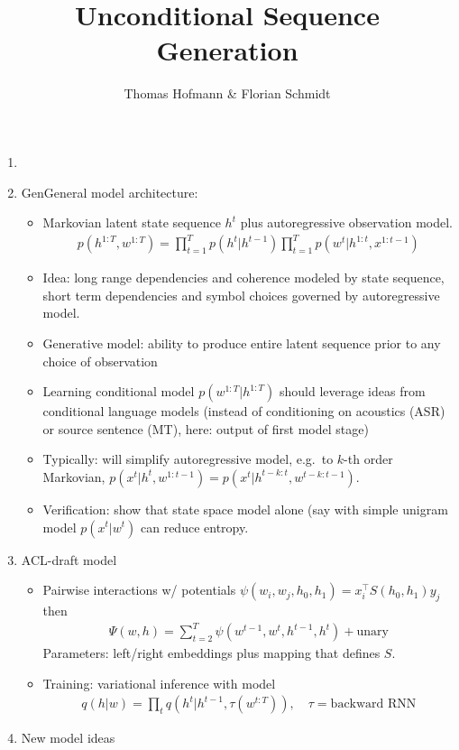 \documentclass{article}
\author{Thomas Hofmann \& Florian Schmidt}
\title{Unconditional Sequence Generation}
\newcommand{\is}[1]{\setlength{\itemsep}{#1}}
\begin{document}
\maketitle 
\begin{enumerate}
\item 

\newpage

\item GenGeneral model architecture: 
\begin{itemize} \is{2mm}
\item Markovian latent state sequence $h^t$ plus autoregressive observation model. 
\begin{align}
p(h^{1:T}, w^{1:T}) = \prod_{t=1}^T p(h^{t} \vert h^{t-1}) \prod_{t=1}^T p(w^t | h^{1:t}, x^{1:t-1})
\end{align}

\item Idea: long range dependencies and coherence modeled by state sequence, short term dependencies and symbol choices governed by autoregressive model. 
\item Generative model: ability to produce entire latent sequence prior to any choice of observation
\item Learning conditional model $p(w^{1:T} | h^{1:T})$ should leverage ideas from conditional language models (instead of conditioning on acoustics (ASR) or source sentence (MT), here: output of first model stage)
\item Typically: will simplify autoregressive model, e.g.~to $k$-th order Markovian, $p(x^t | h^t, w^{1:t-1})= p(x^t | h^{t-k:t}, w^{t-k:t-1})$.
\item Verification: show that state space model alone (say with simple unigram model $p(x^t | w^t)$ can reduce entropy. 
\end{itemize}
\item ACL-draft model 
\begin{itemize} \is{2mm}
\item Pairwise interactions w/ potentials $\psi(w_i,w_j, h_0,h_1) = x_i^\top S(h_0,h_1)  y_j$ then 
\begin{align}
\Psi(w,h) = \sum_{t=2}^T  \psi(w^{t-1},w^t,h^{t-1},h^t)  + \text{unary}
\end{align}
Parameters: left/right embeddings plus mapping that defines $S$.
\item Training: variational inference with model 
\begin{align}
q(h|w) = \prod_t q(h^t \vert h^{t-1}, \tau(w^{t:T})), \quad \tau = \text{backward RNN}
\end{align}
\end{itemize}
\item New model ideas 
\end{enumerate}
\end{document}
